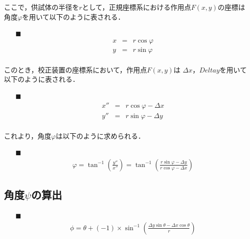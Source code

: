 \documentclass[twocolumn,a4j]{jsarticle}
\begin{document}
ここで，供試体の半径を$r$として，正規座標系における作用点$F\left(x,y\right)$の座標は
角度$\varphi$を用いて以下のように表される．

\begin{itemize}
    \item [$\blacksquare$] 
          \begin{eqnarray*}
            x &=& r \cos \varphi\\
            y &=& r \sin \varphi\\
          \end{eqnarray*}
\end{itemize}

このとき，校正装置の座標系において，作用点$F\left(x, y\right)$は
$\Delta x$，$Delta y$を用いて以下のように表される．

\begin{itemize}
    \item [$\blacksquare$] 
          \begin{eqnarray*}
            x'' &=& r \cos \varphi - \Delta x\\
            y'' &=& r \sin \varphi - \Delta y\\
          \end{eqnarray*}
\end{itemize}

これより，角度$\varphi$は以下のように求められる．

\begin{itemize}
    \item [$\blacksquare$] 
          \begin{eqnarray*}
            \varphi = \tan ^{-1} \left(\frac{y''}{x''}\right) 
            = \tan ^{-1} \left(\frac{ r \sin \varphi - \Delta y}{ r \cos \varphi - \Delta x}\right) 
          \end{eqnarray*}
\end{itemize}

\subsection{角度$\psi$の算出}

\begin{itemize}
    \item [$\blacksquare$] 
          \begin{eqnarray*}
            \phi = \theta + \left(-1\right) × \sin^{-1}\left(\frac{\Delta y \sin \theta - \Delta x \cos \theta}{r}\right)
          \end{eqnarray*}
\end{itemize}
\end{document}
